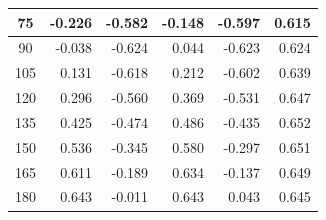 \begin{table}[htbp]
\begin{center}
\begin{tabular}{|p{20mm}|p{20mm}|p{20mm}|p{20mm}|p{20mm}|p{20mm}|}
      \multicolumn{1}{|c|}{75}                      & \multicolumn{1}{|r|}{-0.226}               & \multicolumn{1}{|r|}{-0.582}               & \multicolumn{1}{|r|}{-0.148}               & \multicolumn{1}{|r|}{-0.597}               & \multicolumn{1}{|r|}{0.615}                    \\ \hline
      \multicolumn{1}{|c|}{90}                      & \multicolumn{1}{|r|}{-0.038}               & \multicolumn{1}{|r|}{-0.624}               & \multicolumn{1}{|r|}{0.044}                & \multicolumn{1}{|r|}{-0.623}               & \multicolumn{1}{|r|}{0.624}                    \\ \hline
      \multicolumn{1}{|c|}{105}                     & \multicolumn{1}{|r|}{0.131}                & \multicolumn{1}{|r|}{-0.618}               & \multicolumn{1}{|r|}{0.212}                & \multicolumn{1}{|r|}{-0.602}               & \multicolumn{1}{|r|}{0.639}                    \\ \hline
      \multicolumn{1}{|c|}{120}                     & \multicolumn{1}{|r|}{0.296}                & \multicolumn{1}{|r|}{-0.560}               & \multicolumn{1}{|r|}{0.369}                & \multicolumn{1}{|r|}{-0.531}               & \multicolumn{1}{|r|}{0.647}                    \\ \hline
      \multicolumn{1}{|c|}{135}                     & \multicolumn{1}{|r|}{0.425}                & \multicolumn{1}{|r|}{-0.474}               & \multicolumn{1}{|r|}{0.486}                & \multicolumn{1}{|r|}{-0.435}               & \multicolumn{1}{|r|}{0.652}                    \\ \hline
      \multicolumn{1}{|c|}{150}                     & \multicolumn{1}{|r|}{0.536}                & \multicolumn{1}{|r|}{-0.345}               & \multicolumn{1}{|r|}{0.580}                & \multicolumn{1}{|r|}{-0.297}               & \multicolumn{1}{|r|}{0.651}                    \\ \hline
      \multicolumn{1}{|c|}{165}                     & \multicolumn{1}{|r|}{0.611}                & \multicolumn{1}{|r|}{-0.189}               & \multicolumn{1}{|r|}{0.634}                & \multicolumn{1}{|r|}{-0.137}               & \multicolumn{1}{|r|}{0.649}                    \\ \hline
      \multicolumn{1}{|c|}{180}                     & \multicolumn{1}{|r|}{0.643}                & \multicolumn{1}{|r|}{-0.011}               & \multicolumn{1}{|r|}{0.643}                & \multicolumn{1}{|r|}{0.043}                & \multicolumn{1}{|r|}{0.645}                    \\ \hline

\end{tabular}
\end{center}
\end{table}
